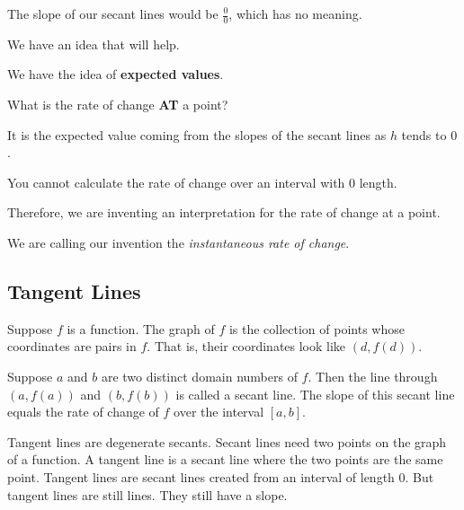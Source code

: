 \documentclass{ximera}
\begin{document}
The slope of our secant lines would be $\frac{0}{0}$, which has no meaning.







We have an idea that will help.

We have the idea of \textbf{\textcolor{blue!55!black}{expected values}}.




What is the rate of change \textbf{\textcolor{red!90!darkgray}{AT}} a point? 


It is the expected value coming from the slopes of the secant lines as $h$ tends to $0$.






\begin{idea}

You cannot calculate the rate of change over an interval with $0$ length.  

Therefore, we are inventing an interpretation for the rate of change at a point. 

We are calling our invention the \textit{instantaneous rate of change}.


\end{idea}











\subsection*{Tangent Lines}

Suppose $f$ is a function.  The graph of $f$ is the collection of points whose coordinates are pairs in $f$.  That is, their coordinates look like $(d, f(d))$.

Suppose $a$ and $b$ are two distinct domain numbers of $f$.  Then the line through $(a, f(a))$ and $(b, f(b))$ is called a secant line.  The slope of this secant line equals the rate of change of $f$ over the interval $[a, b]$.

Tangent lines are degenerate secants. Secant lines need two points on the graph of a function.  A tangent line is a secant line where the two points are the same point. Tangent lines are secant lines created from an interval of length $0$.  But tangent lines are still lines.  They still have a slope.
\end{document}
